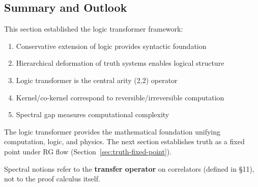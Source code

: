 \subsection{Summary and Outlook}

This section established the logic transformer framework:

\begin{enumerate}
\item Conservative extension of logic provides syntactic foundation
\item Hierarchical deformation of truth systems enables logical structure
\item Logic transformer is the central arity (2,2) operator
\item Kernel/co-kernel correspond to reversible/irreversible computation
\item Spectral gap measures computational complexity
\end{enumerate}

The logic transformer provides the mathematical foundation unifying computation, logic, and physics. The next section establishes truth as a fixed point under RG flow (Section~\ref{sec:truth-fixed-point}).

Spectral notions refer to the \textbf{transfer operator} on correlators (defined in §11), not to the proof calculus itself.